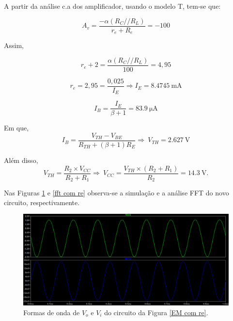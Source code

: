 \documentclass[journal, a4paper]{IEEEtran}
\begin{document}
     \tab A partir da análise c.a dos amplificador, usando o modelo T, tem-se que:
     
       $$     A_v = \frac{-\alpha(R_C//R_L)}{r_e + R_e} = -100 $$
      
    \tab Assim, 
     
       $$     r_e+2 = \frac{\alpha(R_C//R_L)}{100} = 4,95$$
       
       $$ r_e =2,95 = \frac{0,025}{I_E} \Rightarrow I_E = \SI{8,4745}{\milli\ampere}$$
       
       $$I_B = \frac{I_E}{\beta+1} = \SI{83,9}{\micro\ampere}$$
       
    \tab Em que,  
       $$ I_B = \frac{V_{TH}-V_{BE}}{R_{TH}+(\beta+1)R_{E}} \Rightarrow \: V_{TH} = \SI{2,627}{\volt}$$
       
    \tab Além disso,
      $$ V_{TH}= \frac{R_2 \times V_{CC} }{R_2+R_1} \Rightarrow \: V_{CC} = \frac{V_{TH} \times(R_2+R_1) }{R_2} = \SI{14,3}{\volt}.$$
     \vspace{0.3 cm} 
      
    \tab Nas Figuras \ref{osciloscopio com menor distorção} e \ref{fft com re} observa-se a simulação e a análise FFT do novo circuito, respectivamente. 
        
        \begin{figure}[H]
    		\begin{center}
    		\includegraphics[width=\columnwidth]{Av_menor_distorcao.PNG}
    		\caption{Formas de onda de $V_o$ e $V_i$ do circuito da Figura \ref{EM com re}.}
    		\label{osciloscopio com menor distorção}
    		\end{center}
    	\end{figure}
    	
\end{document}
